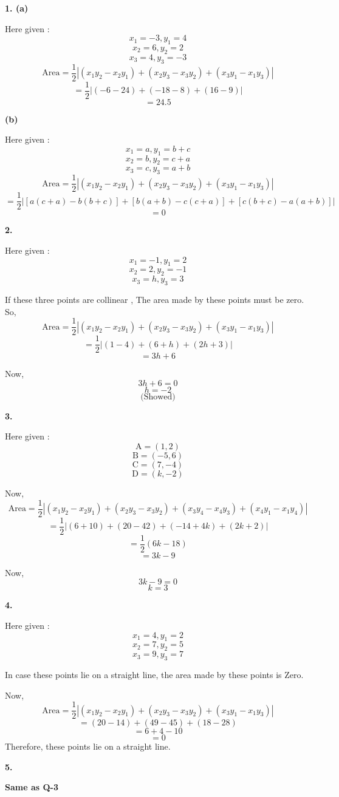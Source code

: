\documentclass{article}
\begin{document}
\begin{flushleft}
\newpage
\textbf{1. \hspace{0.4cm}(a)}\par
\vspace{0.5cm}
 Here given : 
\[ x_1 = -3, y_1 = 4 \]
\[ x_2 = 6, y_2 = 2 \]
\[ x_3 = 4, y_3 = -3 \]
\[\text{Area} = \frac{1}{2} |(x_1y_2-x_2y_1)+(x_2y_3-x_3y_2)+(x_3y_1-x_1y_3)| \]
\[=\frac{1}{2} |(-6-24)+(-18-8)+(16-9)|\]
\[=24.5\]\par
\vspace{1cm}
\textbf{\hspace{1cm}(b)}\par
\vspace{0.5cm}
 Here given :
\[ x_1 = a, y_1 = b+c \]
\[ x_2 = b, y_2 = c+a \]
\[ x_3 = c, y_3 = a+b \]
\[\text{Area} = \frac{1}{2} |(x_1y_2-x_2y_1)+(x_2y_3-x_3y_2)+(x_3y_1-x_1y_3)| \]
\[=\frac{1}{2} |[a(c+a)-b(b+c)]+[b(a+b)-c(c+a)]+[c(b+c)-a(a+b)]|\]
\[=0\]\par
\vspace{1cm}
\textbf{2.}\par
\vspace{0.5cm}
Here given :
\[ x_1 = -1, y_1 = 2 \]
\[ x_2 = 2, y_2 = -1 \]
\[ x_3 = h, y_3 = 3 \]\par

If these three points are collinear , The area made by these points must be zero. So,
\[\text{Area} = \frac{1}{2} |(x_1y_2-x_2y_1)+(x_2y_3-x_3y_2)+(x_3y_1-x_1y_3)| \]
\[=\frac{1}{2} |(1-4)+(6+h)+(2h+3)|\]
\[=3h+6\]\par
Now,
\[3h+6=0\]
\[h=-2\]
\[\text{(Showed)}\]\par
\newpage
\textbf{3.}\par
\vspace{0.5cm}
Here given : 
\[\text{A}=(1,2)\]
\[\text{B}=(-5,6)\]
\[\text{C}=(7,-4)\]
\[\text{D}=(k,-2)\]\par
Now,
\[\text{Area} = \frac{1}{2} |(x_1y_2-x_2y_1)+(x_2y_3-x_3y_2)+(x_3y_4-x_4y_3)+(x_4y_1-x_1y_4)| \]
\[=\frac{1}{2}|(6+10)+(20-42)+(-14+4k)+(2k+2)|\]
\[=\frac{1}{2}(6k-18)\]
\[=3k-9\]\par
Now,
\[3k-9=0\]
\[k=3\]\par
\vspace{1cm}
\textbf{4.}\par
\vspace{0.5cm}
Here given : 
\[ x_1 = 4, y_1 = 2 \]
\[ x_2 = 7, y_2 = 5 \]
\[ x_3 = 9, y_3 = 7 \]\par

In case these points lie on a straight line, the area made by these points is Zero.\par
\vspace{0.5cm}
Now,
\[\text{Area} = \frac{1}{2} |(x_1y_2-x_2y_1)+(x_2y_3-x_3y_2)+(x_3y_1-x_1y_3)| \]
\[=(20-14)+(49-45)+(18-28)\]
\[=6+4-10\]
\[=0\]
\vspace{0.5cm}
Therefore, these points lie on a straight line.\par
\vspace{1cm}
\textbf{5.}\par
\vspace{0.5cm}
\textbf{Same as Q-3}\par



\end{flushleft}
\end{document}
